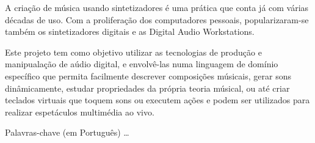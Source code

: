 A criação de música usando sintetizadores é uma prática que conta já com várias décadas de uso. Com a proliferação dos computadores pessoais, popularizaram-se também os sintetizadores digitais e as Digital Audio Workstations.

Este projeto tem como objetivo utilizar as tecnologias de produção e manipualação de aúdio digital, e envolvê-las numa linguagem de domínio específico que permita facilmente descrever composições músicais, gerar sons dinâmicamente, estudar propriedades da própria teoria músical, ou até criar teclados virtuais que toquem sons ou executem ações e podem ser utilizados para realizar espetáculos multimédia ao vivo.
\begin{keywords}
Palavras-chave (em Português) \ldots
\end{keywords}

